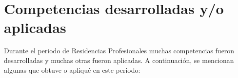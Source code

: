 \chapter{Competencias desarrolladas y/o aplicadas}
Durante el periodo de Residencias Profesionales muchas competencias fueron desarrolladas y muchas otras fueron aplicadas. A continuación, se mencionan algunas que obtuve o apliqué en este periodo:
    
    
    